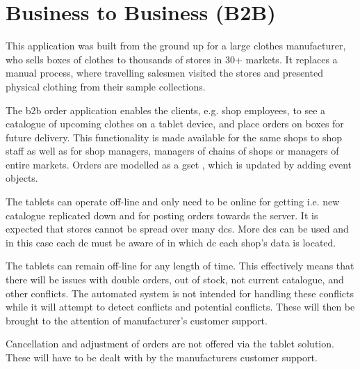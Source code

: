 \section{Business to Business (B2B)}
This application was built from the ground up for a large clothes manufacturer, who sells boxes of clothes to thousands of stores in 30+ markets. It replaces a manual process, where travelling salesmen visited the stores and presented physical clothing from their sample collections.

The \gls{b2b} order application enables the clients, e.g. shop employees, to see a catalogue of upcoming clothes on a tablet device, and place orders on boxes for future delivery. This functionality is made available for the same shops to shop staff as well as for shop managers, managers of chains of shops or managers of entire markets. Orders are modelled as a \gls{gset} \cite{shapiro11comprehensive}, which is updated by adding event objects.

The tablets can operate off-line and only need to be online for getting i.e. new catalogue replicated down and for posting orders towards the server. It is expected that stores cannot be spread over many \glspl{dc}. More \glspl{dc} can be used and in this case each \gls{dc} must be aware of in which \gls{dc} each shop's data is located.

The tablets can remain off-line for any length of time. This effectively means that there will be issues with double orders, out of stock, not current catalogue, and other conflicts. The automated system is not intended for handling these conflicts while it will attempt to detect conflicts and potential conflicts. These will then be brought to the attention of manufacturer's customer support.

Cancellation and adjustment of orders are not offered via the tablet solution. These will have to be dealt with by the manufacturers customer support.
